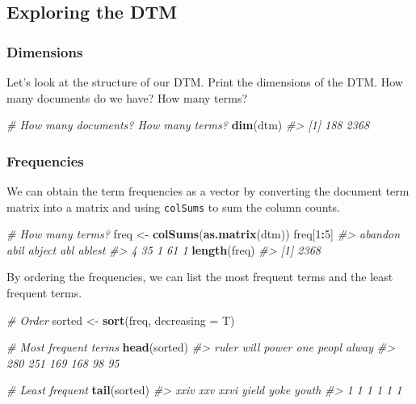 \documentclass[
]{book}
\newenvironment{Shaded}{\begin{snugshade}}{\end{snugshade}}
\newcommand{\CommentTok}[1]{\textcolor[rgb]{0.56,0.35,0.01}{\textit{#1}}}
\newcommand{\DataTypeTok}[1]{\textcolor[rgb]{0.13,0.29,0.53}{#1}}
\newcommand{\DecValTok}[1]{\textcolor[rgb]{0.00,0.00,0.81}{#1}}
\newcommand{\KeywordTok}[1]{\textcolor[rgb]{0.13,0.29,0.53}{\textbf{#1}}}
\newcommand{\NormalTok}[1]{#1}
\newcommand{\OperatorTok}[1]{\textcolor[rgb]{0.81,0.36,0.00}{\textbf{#1}}}
\newcommand{\StringTok}[1]{\textcolor[rgb]{0.31,0.60,0.02}{#1}}
\begin{document}
\hypertarget{exploring-the-dtm}{%
\subsection{Exploring the DTM}\label{exploring-the-dtm}}

\hypertarget{dimensions}{%
\subsubsection*{Dimensions}\label{dimensions}}

Let's look at the structure of our DTM. Print the dimensions of the DTM. How many documents do we have? How many terms?

\begin{Shaded}
\begin{Highlighting}[]
\CommentTok{# How many documents? How many terms?}
\KeywordTok{dim}\NormalTok{(dtm)}
\CommentTok{#> [1]  188 2368}
\end{Highlighting}
\end{Shaded}

\hypertarget{frequencies}{%
\subsubsection*{Frequencies}\label{frequencies}}

We can obtain the term frequencies as a vector by converting the document term matrix into a matrix and using \texttt{colSums} to sum the column counts.

\begin{Shaded}
\begin{Highlighting}[]
\CommentTok{# How many terms?}
\NormalTok{freq <-}\StringTok{ }\KeywordTok{colSums}\NormalTok{(}\KeywordTok{as.matrix}\NormalTok{(dtm))}
\NormalTok{freq[}\DecValTok{1}\OperatorTok{:}\DecValTok{5}\NormalTok{]}
\CommentTok{#> abandon    abil  abject     abl  ablest }
\CommentTok{#>       4      35       1      61       1}
\KeywordTok{length}\NormalTok{(freq)}
\CommentTok{#> [1] 2368}
\end{Highlighting}
\end{Shaded}

By ordering the frequencies, we can list the most frequent terms and the least frequent terms.

\begin{Shaded}
\begin{Highlighting}[]
\CommentTok{# Order}
\NormalTok{sorted <-}\StringTok{ }\KeywordTok{sort}\NormalTok{(freq, }\DataTypeTok{decreasing =}\NormalTok{ T)}

\CommentTok{# Most frequent terms}
\KeywordTok{head}\NormalTok{(sorted)}
\CommentTok{#> ruler  will power   one peopl alway }
\CommentTok{#>   280   251   169   168    98    95}

\CommentTok{# Least frequent}
\KeywordTok{tail}\NormalTok{(sorted)}
\CommentTok{#>  xxiv   xxv  xxvi yield  yoke youth }
\CommentTok{#>     1     1     1     1     1     1}
\end{Highlighting}
\end{Shaded}
\end{document}
